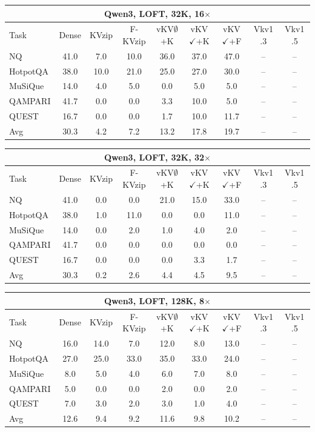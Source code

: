 \begin{tabular}{lcccccccc}
\toprule
\multicolumn{9}{c}{Qwen3, LOFT, 32K, 16$\times$} \\
\midrule
Task & Dense & KVzip & F-KVzip & vKV$\emptyset$+K & vKV$\checkmark$+K & vKV$\checkmark$+F & Vkv1 .3 & Vkv1 .5 \\
\midrule
NQ & 41.0 & 7.0 & 10.0 & 36.0 & 37.0 & 47.0 & -- & -- \\
HotpotQA & 38.0 & 10.0 & 21.0 & 25.0 & 27.0 & 30.0 & -- & -- \\
MuSiQue & 14.0 & 4.0 & 5.0 & 0.0 & 5.0 & 5.0 & -- & -- \\
QAMPARI & 41.7 & 0.0 & 0.0 & 3.3 & 10.0 & 5.0 & -- & -- \\
QUEST & 16.7 & 0.0 & 0.0 & 1.7 & 10.0 & 11.7 & -- & -- \\
\midrule
Avg & 30.3 & 4.2 & 7.2 & 13.2 & 17.8 & 19.7 & -- & -- \\
\bottomrule
\end{tabular}
\vspace{0.8em}

\begin{tabular}{lcccccccc}
\toprule
\multicolumn{9}{c}{Qwen3, LOFT, 32K, 32$\times$} \\
\midrule
Task & Dense & KVzip & F-KVzip & vKV$\emptyset$+K & vKV$\checkmark$+K & vKV$\checkmark$+F & Vkv1 .3 & Vkv1 .5 \\
\midrule
NQ & 41.0 & 0.0 & 0.0 & 21.0 & 15.0 & 33.0 & -- & -- \\
HotpotQA & 38.0 & 1.0 & 11.0 & 0.0 & 0.0 & 11.0 & -- & -- \\
MuSiQue & 14.0 & 0.0 & 2.0 & 1.0 & 4.0 & 2.0 & -- & -- \\
QAMPARI & 41.7 & 0.0 & 0.0 & 0.0 & 0.0 & 0.0 & -- & -- \\
QUEST & 16.7 & 0.0 & 0.0 & 0.0 & 3.3 & 1.7 & -- & -- \\
\midrule
Avg & 30.3 & 0.2 & 2.6 & 4.4 & 4.5 & 9.5 & -- & -- \\
\bottomrule
\end{tabular}
\vspace{0.8em}

\begin{tabular}{lcccccccc}
\toprule
\multicolumn{9}{c}{Qwen3, LOFT, 128K, 8$\times$} \\
\midrule
Task & Dense & KVzip & F-KVzip & vKV$\emptyset$+K & vKV$\checkmark$+K & vKV$\checkmark$+F & Vkv1 .3 & Vkv1 .5 \\
\midrule
NQ & 16.0 & 14.0 & 7.0 & 12.0 & 8.0 & 13.0 & -- & -- \\
HotpotQA & 27.0 & 25.0 & 33.0 & 35.0 & 33.0 & 24.0 & -- & -- \\
MuSiQue & 8.0 & 5.0 & 4.0 & 6.0 & 7.0 & 8.0 & -- & -- \\
QAMPARI & 5.0 & 0.0 & 0.0 & 2.0 & 0.0 & 2.0 & -- & -- \\
QUEST & 7.0 & 3.0 & 2.0 & 3.0 & 1.0 & 4.0 & -- & -- \\
\midrule
Avg & 12.6 & 9.4 & 9.2 & 11.6 & 9.8 & 10.2 & -- & -- \\
\bottomrule
\end{tabular}
\vspace{0.8em}

